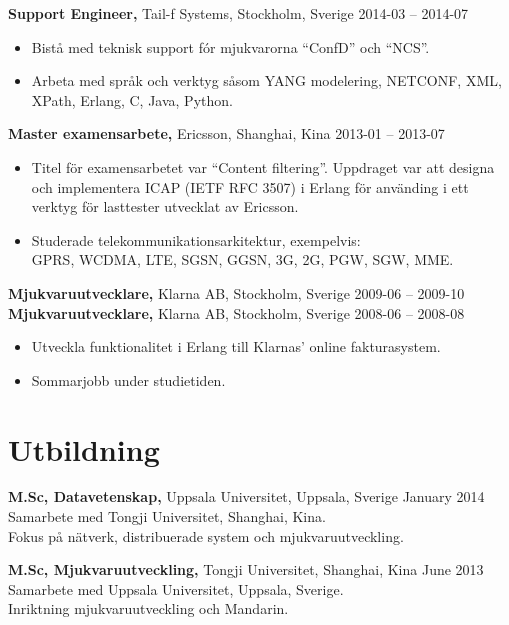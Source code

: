 \documentclass[margin]{res}
\begin{document}
\begin{resume}
{\bf Support Engineer,} Tail-f Systems, Stockholm, Sverige \hfill 2014-03 -- 2014-07
 \begin{itemize} \itemsep -2pt  %
 \item Bistå med teknisk support fór mjukvarorna ``ConfD'' och ``NCS''.
 \item Arbeta med språk och verktyg såsom YANG modelering, NETCONF,
   XML, XPath, Erlang, C, Java, Python.
 \end{itemize}

{\bf Master examensarbete,} Ericsson, Shanghai, Kina \hfill 2013-01 -- 2013-07
 \begin{itemize} \itemsep -2pt  %
 \item Titel för examensarbetet var ``Content filtering''. Uppdraget var
   att designa och implementera ICAP (IETF RFC 3507) i Erlang för
   använding i ett verktyg för lasttester utvecklat av Ericsson.
 \item Studerade telekommunikationsarkitektur, exempelvis: \\
 GPRS, WCDMA, LTE, SGSN, GGSN, 3G, 2G, PGW, SGW, MME.
 \end{itemize}

{\bf Mjukvaruutvecklare,} Klarna AB, Stockholm, Sverige \hfill 2009-06 -- 2009-10\\
{\bf Mjukvaruutvecklare,} Klarna AB, Stockholm, Sverige \hfill 2008-06 -- 2008-08
\begin{itemize} \itemsep -2pt  %
\item Utveckla funktionalitet i Erlang till Klarnas' online fakturasystem.
\item Sommarjobb under studietiden.
\end{itemize}

\section{Utbildning}
{\bf M.Sc,  Datavetenskap,} Uppsala Universitet, Uppsala, Sverige \hfill January 2014 \\
Samarbete med Tongji Universitet, Shanghai, Kina. \\
Fokus på nätverk, distribuerade system och mjukvaruutveckling.

{\bf M.Sc, Mjukvaruutveckling,} Tongji Universitet, Shanghai, Kina \hfill June 2013 \\
Samarbete med Uppsala Universitet, Uppsala, Sverige. \\
Inriktning mjukvaruutveckling och Mandarin.


\end{resume}
\end{document}
